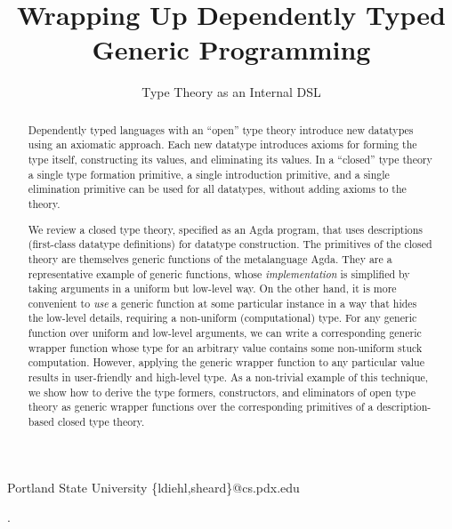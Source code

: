 \documentclass[preprint,nonatbib]{sigplanconf}
\begin{document}
\setlength{\pdfpageheight}{\paperheight}
\setlength{\pdfpagewidth}{\paperwidth}


\title{Wrapping Up Dependently Typed Generic Programming}
\subtitle{Type Theory as an Internal DSL}

           {Portland State University}
           {\{ldiehl,sheard\}@cs.pdx.edu}

\maketitle

\begin{abstract}
Dependently typed languages with an ``open'' type theory
introduce new datatypes using an axiomatic approach.
Each new datatype introduces axioms for forming the type itself,
constructing its values, and eliminating its values. In a ``closed''
type theory a single type formation primitive, a single introduction
primitive, and a single elimination primitive can be used for all
datatypes, without adding axioms to the theory.

We review a closed type theory, specified as an Agda program, that
uses descriptions (first-class datatype definitions) for datatype
construction. The primitives of the closed theory are themselves
generic functions of the metalanguage Agda. They are a representative
example of generic functions, whose {\it implementation} is simplified
by taking arguments in a uniform but low-level way. On the other hand,
it is more convenient to {\it use} a generic function at some
particular instance in a way that hides the low-level details, requiring
a non-uniform (computational) type. For any generic function over
uniform and low-level arguments, we can write a corresponding generic
wrapper function whose type for an arbitrary value contains some non-uniform
stuck computation.
However, applying the generic wrapper function to any
particular value results in user-friendly and high-level type. As a
non-trivial example of this technique, we show how to derive the
type formers, constructors, and eliminators of open type theory as
generic wrapper functions over the corresponding primitives of a
description-based closed type theory. 
\end{abstract}

.
\end{document}
